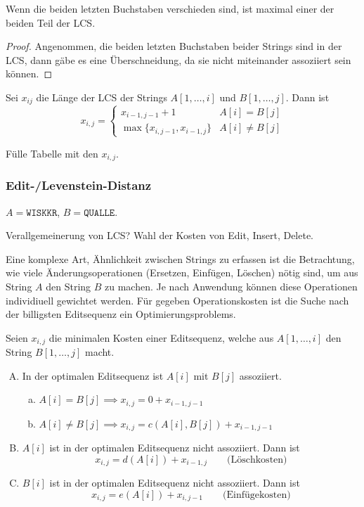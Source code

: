 \documentclass[11pt]{scrartcl}
\begin{document}
\begin{st}
	Wenn die beiden letzten Buchstaben verschieden sind, ist maximal einer der beiden Teil der LCS.
	\begin{proof}
		Angenommen, die beiden letzten Buchstaben beider Strings sind in der LCS, dann gäbe es eine Überschneidung, da sie nicht miteinander assoziiert sein können.
	\end{proof}
\end{st}

\begin{st}
	Sei $x_{ij}$ die Länge der LCS der Strings $A[1,\dotsc,i]$ und $B[1,\dotsc,j]$.
	Dann ist
	\[
		x_{i,j} = \begin{cases}
			x_{i-1,j-1} + 1 			& A[i] = B[j] \\
			\max\{x_{i,j-1}, x_{i-1,j}\} & A[i] \neq B[j]
		\end{cases}
	\]
\end{st}

\begin{note}
	Fülle Tabelle mit den $x_{i,j}$.
\end{note}


\subsubsection{Edit-/Levenstein-Distanz}


\begin{ex}
	$A = \texttt{WISKKR}$, $B = \texttt{QUALLE}$.
\end{ex}
Verallgemeinerung von LCS? Wahl der Kosten von Edit, Insert, Delete.

Eine komplexe Art, Ähnlichkeit zwischen Strings zu erfassen ist die Betrachtung, wie viele Änderungsoperationen (Ersetzen, Einfügen, Löschen) nötig sind, um aus String $A$ den String $B$ zu machen.
Je nach Anwendung können diese Operationen individiuell gewichtet werden.
Für gegeben Operationskosten ist die Suche nach der billigsten Editsequenz ein Optimierungsproblems.

Seien $x_{i,j}$ die minimalen Kosten einer Editsequenz, welche aus $A[1,\dotsc,i]$ den String $B[1,\dotsc,j]$ macht.

\begin{enumerate}[A)]
	\item
		In der optimalen Editsequenz ist $A[i]$ mit $B[j]$ assoziiert.
		\begin{enumerate}[a)]
			\item
				$A[i] = B[j] \implies x_{i,j} = 0 + x_{i-1,j-1}$
			\item
				$A[i] \neq B[j] \implies x_{i,j} = c(A[i], B[j]) + x_{i-1,j-1}$
		\end{enumerate}
	\item
		$A[i]$ ist in der optimalen Editsequenz nicht assoziiert.
		Dann ist
		\[
			x_{i,j} = d(A[i]) + x_{i-1,j} \qquad \text{(Löschkosten)}
		\]
	\item
		$B[i]$ ist in der optimalen Editsequenz nicht assoziiert.
		Dann ist
		\[
			x_{i,j} = e(A[i]) + x_{i,j-1} \qquad \text{(Einfügekosten)}
		\]
\end{enumerate}
\end{document}
